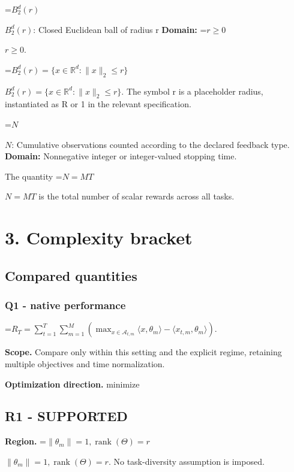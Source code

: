 \documentclass[10pt,a4paper]{article}
\newcommand{\AtlasMath}[1]{\par\begingroup\centering\setbox0=\hbox{$\displaystyle #1$}\ifdim\wd0>1.4\linewidth\typeout{ATLAS WIDE FORMULA: \the\wd0}\fi\ifdim\wd0>\linewidth\resizebox{\linewidth}{!}{\box0}\else\box0\fi\par\endgroup}
\newcommand{\AtlasInlineMath}[1]{\begingroup\setbox0=\hbox{$#1$}\ifdim\wd0>.4\linewidth\endgroup\AtlasMath{#1}\else\endgroup$#1$\fi}
\begin{document}
\AtlasInlineMath{B_2^d(r)}: Closed Euclidean ball of radius r \textbf{Domain:} \AtlasInlineMath{r\ge0}.



\AtlasInlineMath{B_2^d(r)=\{x\in\mathbb R^d:\|x\|_2\le r\}}. The symbol r is a placeholder radius, instantiated as R or 1 in the relevant specification.



\AtlasInlineMath{N}: Cumulative observations counted according to the declared feedback type. \textbf{Domain:} Nonnegative integer or integer-valued stopping time.



The quantity \AtlasInlineMath{N=MT} is the total number of scalar rewards across all tasks.



\section{3. Complexity bracket}


\subsection{Compared quantities}


\subsubsection{Q1 - native performance}


\AtlasMath{R_T=\sum_{t=1}^{T}\sum_{m=1}^{M}\left(\max_{x\in\mathcal A_{t,m}}\langle x,\theta_m\rangle-\langle x_{t,m},\theta_m\rangle\right).}


\textbf{Scope.} Compare only within this setting and the explicit regime, retaining multiple objectives and time normalization.



\textbf{Optimization direction.} minimize



\subsection{R1 - SUPPORTED}


\textbf{Region.} \AtlasInlineMath{\|\theta_m\|=1,\operatorname{rank}(\Theta)=r}. No task-diversity assumption is imposed.
\end{document}
